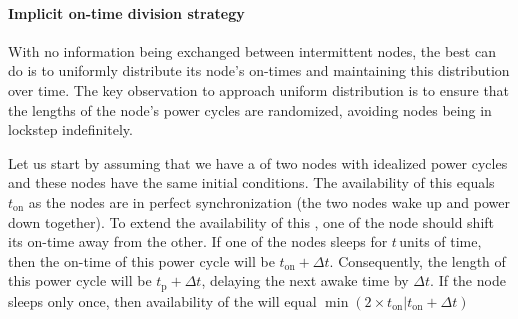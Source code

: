 \paragraph{Implicit on-time division strategy} 
With no information being exchanged between intermittent nodes, the best \cis can do is to uniformly distribute its node's on-times and maintaining this distribution over time. 
The key observation to approach uniform distribution is to ensure that the lengths of the node's power cycles are randomized, avoiding nodes being in lockstep indefinitely.

Let us start by assuming that we have a \cis of two nodes with idealized power cycles and these nodes have the same initial conditions. The availability of this \cis equals $t_\text{on}$ as the nodes are in perfect synchronization (the two nodes wake up and power down together). 
To extend the availability of this \cis, one of the node should
shift its on-time away from the other. If one of the nodes sleeps for $t$\,units of time, then the on-time of this power cycle will be $t_\text{on}+\Delta t$. Consequently, the length of this power cycle will be $t_\text{p} + \Delta t $, delaying the next awake time by $\Delta t$.
If the node sleeps only once, then availability of the \cis will equal $\min \left(2\times t_\text{on}| t_\text{on}+\Delta t\right)$

